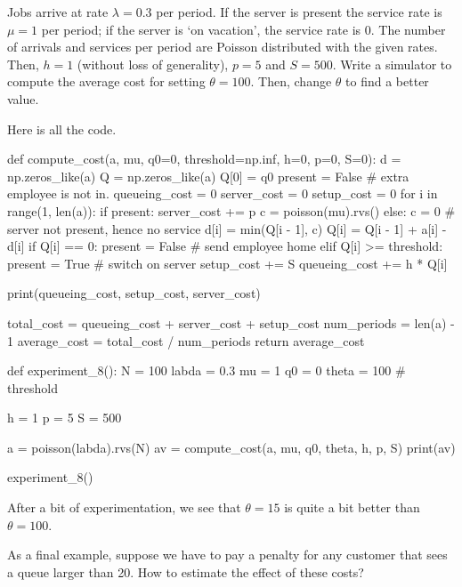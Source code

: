 \begin{exercise}
  Jobs arrive at rate $\lambda=0.3$ per period.
  If the server is present the service rate is $\mu=1$ per period; if the server is `on vacation', the service rate is 0.
  The number of arrivals and services per period are Poisson distributed with the given rates.
  Then, $h=1$ (without loss of generality), $p=5$ and $S=500$.
  Write a simulator to compute the average cost for setting $\theta=100$.
  Then, change $\theta$ to find a better value.

\begin{solution}
Here is all the code.
\begin{pyverbatim}
def compute_cost(a, mu, q0=0, threshold=np.inf, h=0, p=0, S=0):
    d = np.zeros_like(a)
    Q = np.zeros_like(a)
    Q[0] = q0
    present = False  # extra employee is not in.
    queueing_cost = 0
    server_cost = 0
    setup_cost = 0
    for i in range(1, len(a)):
        if present:
            server_cost += p
            c = poisson(mu).rvs()
        else:
            c = 0  # server not present, hence no service
        d[i] = min(Q[i - 1], c)
        Q[i] = Q[i - 1] + a[i] - d[i]
        if Q[i] == 0:
            present = False  # send employee home
        elif Q[i] >= threshold:
            present = True  # switch on server
            setup_cost += S
        queueing_cost += h * Q[i]

    print(queueing_cost, setup_cost, server_cost)

    total_cost = queueing_cost + server_cost + setup_cost
    num_periods = len(a) - 1
    average_cost = total_cost / num_periods
    return average_cost


def experiment_8():
    N = 100
    labda = 0.3
    mu = 1
    q0 = 0
    theta = 100  # threshold

    h = 1
    p = 5
    S = 500

    a = poisson(labda).rvs(N)
    av = compute_cost(a, mu, q0, theta, h, p, S)
    print(av)


experiment_8()
\end{pyverbatim}
After a bit of experimentation, we see that $\theta=15$ is quite a bit better than $\theta=100$.

\end{solution}
\end{exercise}


As a final example, suppose we have to pay a penalty for any customer that sees a queue larger than 20. How to estimate the effect of these costs? 


